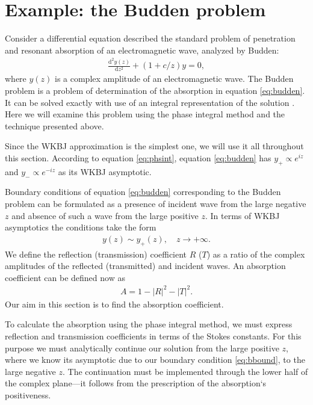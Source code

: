 \documentclass[aip,jmp,reprint]{revtex4-1}
\def\rmd{\mathrm{d}}
\begin{document}
\section{Example: the Budden problem \label{sec:budden}}
Consider a differential equation described the standard problem of penetration and 
resonant absorption of an electromagnetic wave, analyzed by Budden:\cite{white-chen,budden}
\begin{eqnarray}
\frac{\rmd^2 y(z)}{\rmd z^2} + (1+c/z)y = 0,  
\label{eq:budden}
\end{eqnarray}
where $y(z)$ is a complex amplitude of an electromagnetic wave.
The Budden problem is a problem of determination of the absorption in equation \eqref{eq:budden}. 
It can be solved exactly with use of an integral representation of the solution \cite{rwbook}.
Here we will examine this problem using the phase integral method and the technique presented above. 

Since the WKBJ approximation is the simplest one,
we will use it all throughout this section. According to equation \eqref{eq:phsint}, 
equation \eqref{eq:budden} has $y_+ \propto e^{iz}$ and $y_- \propto e^{-iz}$ as its WKBJ asymptotic. 

Boundary conditions of equation \eqref{eq:budden} corresponding to the Budden problem can be
formulated as a presence of incident wave from the large negative $z$ and absence of such 
a wave from the large positive $z$. In terms of WKBJ asymptotics the conditions take the form
\begin{eqnarray}
y(z) \sim y_+(z), \quad z \rightarrow +\infty.  
\label{eq:bbound}
\end{eqnarray}
We define the reflection (transmission) coefficient $R$ ($T$) as
a ratio of the complex amplitudes of the reflected (transmitted) and incident waves. 
An absorption coefficient can be defined now as 
\begin{eqnarray}
A = 1 - |R|^2 - |T|^2.  
\label{eq:absdef}
\end{eqnarray}
Our aim in this section is to find the absorption coefficient.

To calculate the absorption using the phase integral method, we must express 
reflection and transmission coefficients in terms of the Stokes constants. 
For this purpose we must analytically continue our solution from the large positive $z$,
where we know its asymptotic due to our boundary condition \eqref{eq:bbound}, to
the large negative $z$. The continuation must be implemented through the lower half of the
complex plane---it follows from the prescription of the absorption`s positiveness\cite{rwbook}.
\end{document}
